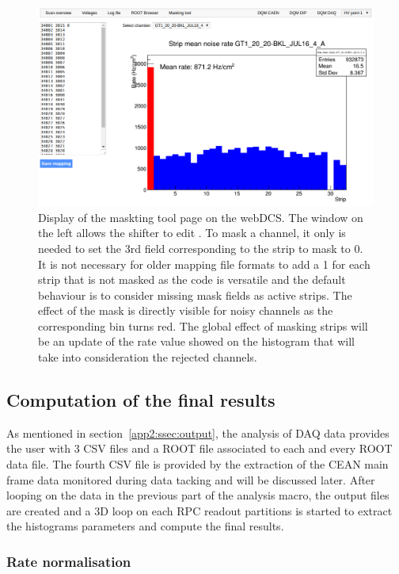 	\begin{figure}[H]
		\centering
		\includegraphics[width = \linewidth]{fig/app2/MaskingTool.png}
		\caption{\label{fig:maskingtool} Display of the maskting tool page on the webDCS. The window on the left allows the shifter to edit . To mask a channel, it only is needed to set the 3rd field corresponding to the strip to mask to 0. It is not necessary for older mapping file formats to add a 1 for each strip that is not masked as the code is versatile and the default behaviour is to consider missing mask fields as active strips. The effect of the mask is directly visible for noisy channels as the corresponding bin turns red. The global effect of masking strips will be an update of the rate value showed on the histogram that will take into consideration the rejected channels.}
	\end{figure}
	
	\subsection{Computation of the final results}
	\label{app2:ssec:results}
	
	As mentioned in section~\ref{app2:ssec:output}, the analysis of DAQ data provides the user with 3 CSV files and a ROOT file associated to each and every ROOT data file. The fourth CSV file is provided by the extraction of the CEAN main frame data monitored during data tacking and will be discussed later. After looping on the data in the previous part of the analysis macro, the output files are created and a 3D loop on each RPC readout partitions is started to extract the histograms parameters and compute the final results.\\
	
		\subsubsection{Rate normalisation}
		\label{app2:sssec:norm}
	

